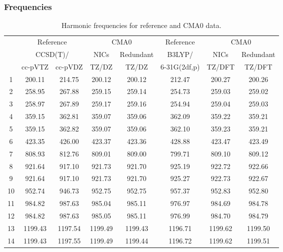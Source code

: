 \documentclass[10pt,oneside]{article}
\begin{document}
\begin{table}[h!]
\subsubsection*{Frequencies}
\centering
\caption{Harmonic frequencies for reference and CMA0 data.}
\begin{tabular}{cccccccc}
\toprule
{} & \multicolumn{2}{c}{Reference} & \multicolumn{2}{c}{CMA0} &    Reference & \multicolumn{2}{c}{CMA0} \\
{} & \multicolumn{2}{c}{CCSD(T)/} &    NICs &  Redundant &       B3LYP/ &    NICs & Redundant \\
{} &   cc-pVTZ & cc-pVDZ &   TZ/DZ &      TZ/DZ & 6-31G(2df,p) &  TZ/DFT &    TZ/DFT \\
\midrule
1  &    200.11 &  214.75 &  200.12 &     200.12 &       212.47 &  200.27 &    200.26 \\
2  &    258.95 &  267.88 &  259.15 &     259.14 &       254.73 &  259.03 &    259.02 \\
3  &    258.97 &  267.89 &  259.17 &     259.16 &       254.94 &  259.04 &    259.03 \\
4  &    359.15 &  362.81 &  359.07 &     359.06 &       362.09 &  359.22 &    359.21 \\
5  &    359.15 &  362.82 &  359.07 &     359.06 &       362.10 &  359.23 &    359.21 \\
6  &    423.35 &  426.00 &  423.37 &     423.36 &       428.88 &  423.47 &    423.49 \\
7  &    808.93 &  812.76 &  809.01 &     809.00 &       799.71 &  809.10 &    809.12 \\
8  &    921.64 &  917.10 &  921.73 &     921.70 &       925.19 &  922.72 &    922.66 \\
9  &    921.64 &  917.10 &  921.73 &     921.70 &       925.27 &  922.73 &    922.67 \\
10 &    952.74 &  946.73 &  952.75 &     952.75 &       957.37 &  952.83 &    952.80 \\
11 &    984.82 &  987.63 &  985.04 &     985.11 &       976.97 &  984.69 &    984.78 \\
12 &    984.82 &  987.63 &  985.05 &     985.11 &       976.99 &  984.70 &    984.79 \\
13 &   1199.43 & 1197.54 & 1199.49 &    1199.43 &      1196.71 & 1199.62 &   1199.50 \\
14 &   1199.43 & 1197.55 & 1199.49 &    1199.44 &      1196.72 & 1199.62 &   1199.51 \\

\end{tabular}
\end{table}
\end{document}
